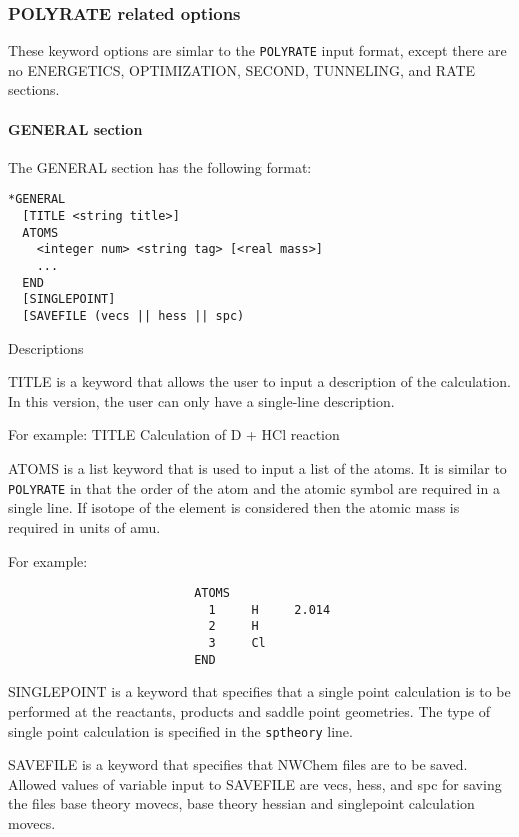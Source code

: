 \subsubsection{POLYRATE related options}

These keyword options are simlar to the \verb+POLYRATE+ input format, except there
are no ENERGETICS, OPTIMIZATION, SECOND, TUNNELING, and RATE sections.

\paragraph{GENERAL section}


The GENERAL section has the following format:

\begin{verbatim}
*GENERAL
  [TITLE <string title>]
  ATOMS
    <integer num> <string tag> [<real mass>]
    ...
  END
  [SINGLEPOINT]
  [SAVEFILE (vecs || hess || spc)
\end{verbatim}

  Descriptions
  
    TITLE is a keyword that allows the user to input a description of
              the calculation.  In this version, the user can only have a 
              single-line description.

              For example: 
                          TITLE Calculation of D + HCl reaction

    ATOMS is a list keyword that is used to input a list of 
              the atoms.  It is similar to \verb+POLYRATE+ in that the order of the 
              atom and the atomic symbol are required in a single line.  If
              isotope of the element is considered then the atomic mass is 
              required in units of amu.

              For example:
\begin{verbatim}
                          ATOMS
                            1     H     2.014
                            2     H 
                            3     Cl
                          END
\end{verbatim}

    SINGLEPOINT is a keyword that specifies that a single
	      point calculation is to be performed at the reactants,
              products and saddle point geometries.  The type of 
              single point calculation is specified in the \verb+sptheory+ 
              line.

    SAVEFILE is a keyword that specifies that NWChem files
	      are to be saved. Allowed values of variable input to
	      SAVEFILE are vecs, hess, and spc for saving the files 
	      base theory movecs, base theory hessian and singlepoint
          calculation movecs.
             
